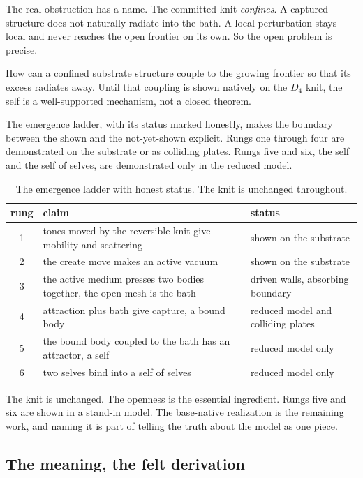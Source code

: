 The real obstruction has a name. The committed knit \emph{confines}. A captured structure does not naturally radiate into the bath. A local perturbation stays local and never reaches the open frontier on its own. So the open problem is precise.

\begin{principle}
How can a confined substrate structure couple to the growing frontier so that its excess radiates away. Until that coupling is shown natively on the $D_4$ knit, the self is a well-supported mechanism, not a closed theorem.
\end{principle}

The emergence ladder, with its status marked honestly, makes the boundary between the shown and the not-yet-shown explicit. Rungs one through four are demonstrated on the substrate or as colliding plates. Rungs five and six, the self and the self of selves, are demonstrated only in the reduced model.

\begin{table}[ht]
\centering
\begin{tabular}{@{}cll@{}}
\toprule
rung & claim & status \\
\midrule
1 & tones moved by the reversible knit give mobility and scattering & shown on the substrate \\
2 & the create move makes an active vacuum & shown on the substrate \\
3 & the active medium presses two bodies together, the open mesh is the bath & driven walls, absorbing boundary \\
4 & attraction plus bath give capture, a bound body & reduced model and colliding plates \\
5 & the bound body coupled to the bath has an attractor, a self & reduced model only \\
6 & two selves bind into a self of selves & reduced model only \\
\bottomrule
\end{tabular}
\caption{The emergence ladder with honest status. The knit is unchanged throughout.}
\label{tab:emergence-ladder}
\end{table}

The knit is unchanged. The openness is the essential ingredient. Rungs five and six are shown in a stand-in model. The base-native realization is the remaining work, and naming it is part of telling the truth about the model as one piece.

\subsection{The meaning, the felt derivation}

